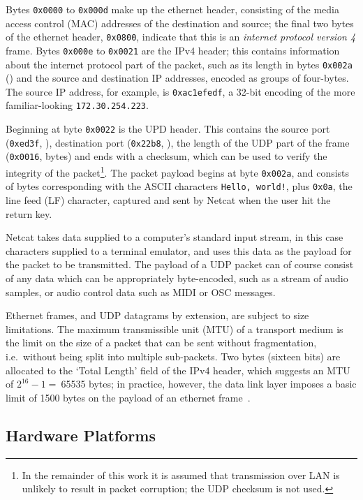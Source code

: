 Bytes \texttt{0x0000} to \texttt{0x000d} make up the ethernet header,
consisting of the media access control (MAC) addresses of the destination and
source; the final two bytes of the ethernet header, \texttt{0x0800}, indicate
that this is an \textit{internet protocol version 4} frame.
Bytes \texttt{0x000e} to \texttt{0x0021} are the IPv4 header; this contains
information about the internet protocol part of the packet, such as its length
in bytes \textemdash{} \texttt{0x002a} () \textemdash{} and
the source and destination IP addresses, encoded as groups of four-bytes.
The source IP address, for example, is \texttt{0xac1efedf}, a 32-bit encoding
of the more familiar-looking \texttt{172.30.254.223}.

Beginning at byte \texttt{0x0022} is the UPD header.
This contains the source port (\texttt{0xed3f}, ), destination
port (\texttt{0x22b8}, ), the length of the UDP part of the frame
(\texttt{0x0016},  bytes) and ends with a checksum, which
can be used to verify the integrity of the packet\footnote{
    In the remainder of this work it is assumed that transmission over LAN is
    unlikely to result in packet corruption; the UDP checksum is not used.
}.
The packet payload begins at byte \texttt{0x002a}, and consists of bytes
corresponding with the ASCII characters \texttt{Hello, world!}, plus
\texttt{0x0a}, the line feed (LF) character, captured and sent by Netcat when
the user hit the return key.

Netcat takes data supplied to a computer's standard input stream, in this
case characters supplied to a terminal emulator, and uses this data as the
payload for the packet to be transmitted.
The payload of a UDP packet can of course consist of any data which can be
appropriately byte-encoded, such as a stream of audio samples, or audio control
data such as MIDI or OSC messages.

Ethernet frames, and UDP datagrams by extension, are subject to size
limitations.
The maximum transmissible unit (MTU) of a transport medium is the limit on the
size of a packet that can be sent without fragmentation, i.e.\ without being
split into multiple sub-packets.
Two bytes (sixteen bits) are allocated to the `Total Length' field of the IPv4
header, which suggests an MTU of $2^{16}-1=~$\num{65535} bytes;
in practice, however, the data link layer imposes a basic limit of \num{1500}
bytes on the payload of an ethernet
frame~\citep{schiavoni_alternatives_2013,noauthor_ieee_2018}.

\subsection{Hardware Platforms}\label{subsec:hardware-platforms}

